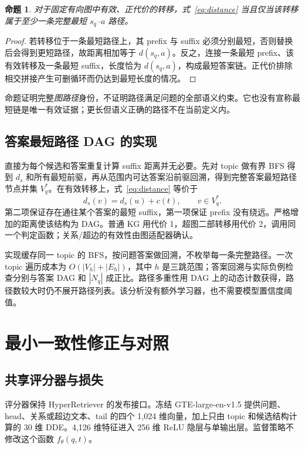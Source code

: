 \documentclass[UTF8,a4paper,10pt,fontset=fandol]{ctexart}
\newtheorem{proposition}{命题}
\begin{document}
\begin{proposition}
对于固定有向图中有效、正代价的转移，式~\eqref{eq:distance} 当且仅当该转移属于至少一条完整最短 $s_q$--$a$ 路径。
\end{proposition}
\begin{proof}
若转移位于一条最短路径上，其 prefix 与 suffix 必须分别最短，否则替换后会得到更短路径，故距离相加等于 $d(s_q,a)$。反之，连接一条最短 prefix、该有效转移及一条最短 suffix，长度恰为 $d(s_q,a)$，构成最短答案链。正代价排除相交拼接产生可删循环而仍达到最短长度的情况。
\end{proof}

命题证明完整\emph{图路径}身份，不证明路径满足问题的全部语义约束。它也没有宣称最短链是唯一有效证据；更长但语义正确的路径不在当前定义内。

\subsection{答案最短路径 DAG 的实现}
直接为每个候选和答案重复计算 suffix 距离并无必要。先对 topic 做有界 BFS 得到 $d_s$ 和所有最短前驱，再从范围内可达答案沿前驱回溯，得到完整答案最短路径节点并集 $V_q^*$。在有效转移上，式~\eqref{eq:distance} 等价于
\begin{equation}
d_s(v)=d_s(u)+c(t),\qquad v\in V_q^*.
\label{eq:dag}
\end{equation}
第二项保证存在通往某个答案的最短 suffix，第一项保证 prefix 没有绕远。严格增加的距离使该结构为 DAG。普通 KG 用代价 1，超图二部转移用代价 2，调用同一个判定函数；关系/超边的有效性由图适配器确认。

实现缓存同一 topic 的 BFS，按问题答案做回溯，不枚举每一条完整路径。一次 topic 遍历成本为 $O(|V_h|+|E_h|)$，其中 $h$ 是三跳范围；答案回溯与实际负例检查分别与答案 DAG 和 $|N_q|$ 成正比。路径多重性用 DAG 上的动态计数获得，路径数较大时仍不展开路径列表。该分析没有额外学习器，也不需要模型置信度阈值。

\section{最小一致性修正与对照}
\subsection{共享评分器与损失}
评分器保持 HyperRetriever 的发布接口\cite{hyperrag}。冻结 GTE-large-en-v1.5 提供问题、head、关系或超边文本、tail 的四个 1,024 维向量，加上只由 topic 和候选结构计算的 30 维 DDE。4,126 维特征进入 256 维 ReLU 隐层与单输出层。监督策略不修改这个函数 $f_\theta(q,t)$。
\end{document}

